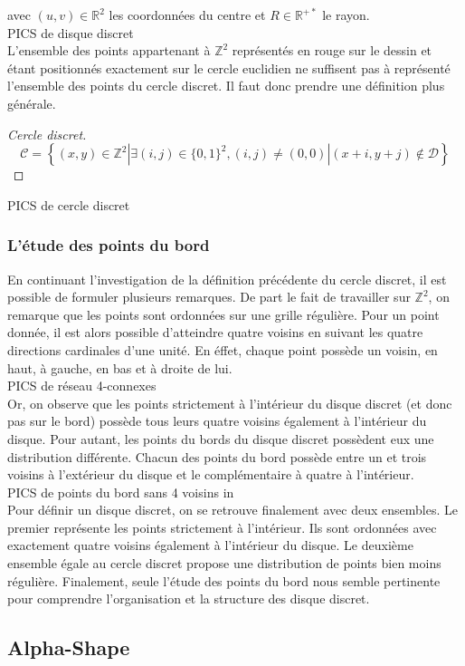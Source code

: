 avec $(u,v) \in \mathbb{R}^{2}$ les coordonnées du centre et $R \in \mathbb{R}^{+*}$ le rayon.\\

PICS de disque discret\\

L'ensemble des points appartenant à $\mathbb{Z}^{2}$ représentés en rouge sur le dessin et étant positionnés exactement sur le cercle euclidien ne suffisent pas à représenté l'ensemble des points du cercle discret. Il faut donc prendre une définition plus générale.

\begin{proof}[Cercle discret]
  $$ \mathcal{C} =  \left\{ (x,y) \in \mathbb{Z}^{2} | \exists (i,j) \in \{0,1\}^2, (i,j) \ne (0,0) | (x+i,y+j) \notin \mathcal{D} \right\}$$
\end{proof}

PICS de cercle discret\\

\subsubsection{L'étude des points du bord}

En continuant l'investigation de la définition précédente du cercle discret, il est possible de formuler plusieurs remarques. De part le fait de travailler sur $\mathbb{Z}^{2}$, on remarque que les points sont ordonnées sur une grille régulière. Pour un point donnée, il est alors possible d'atteindre quatre voisins en suivant les quatre directions cardinales d'une unité. En éffet, chaque point possède un voisin, en haut, à gauche, en bas et à droite de lui. \\

PICS de réseau 4-connexes\\

Or, on observe que les points strictement à l'intérieur du disque discret (et donc pas sur le bord) possède tous leurs quatre voisins également à l'intérieur du disque. Pour autant, les points du bords du disque discret possèdent eux une distribution différente. Chacun des points du bord possède entre un et trois voisins à l'extérieur du disque et le complémentaire à quatre à l'intérieur.\\

PICS de points du bord sans 4 voisins in\\

Pour définir un disque discret, on se retrouve finalement avec deux ensembles. Le premier représente les points strictement à l'intérieur. Ils sont ordonnées avec exactement quatre voisins également à l'intérieur du disque. Le deuxième ensemble égale au cercle discret propose une distribution de points bien moins régulière. Finalement, seule l'étude des points du bord nous semble pertinente pour comprendre l'organisation et la structure des disque discret.

\subsection{Alpha-Shape}

